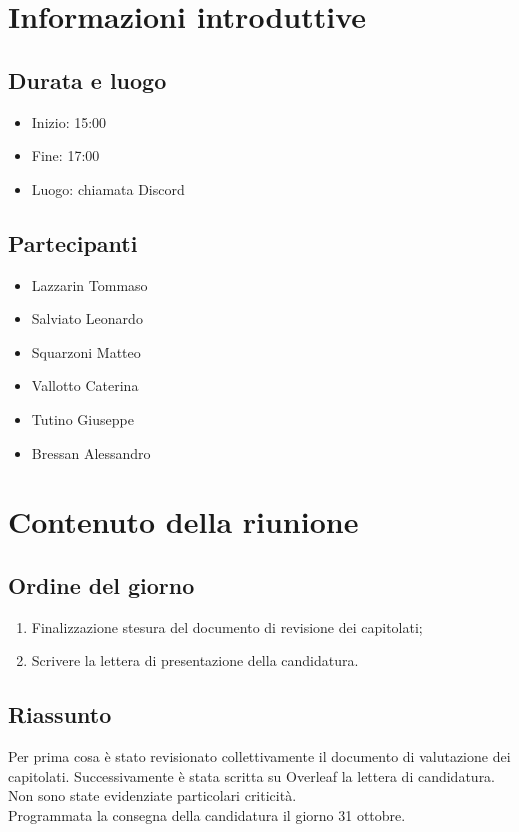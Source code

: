 \documentclass[10pt]{article}
\begin{document}
\section{Informazioni introduttive}
\subsection{Durata e luogo}
\begin{itemize}
  \item Inizio: 15:00
  \item Fine: 17:00
  \item Luogo: chiamata Discord
\end{itemize}
\subsection{Partecipanti}
\begin{itemize}
  \item Lazzarin Tommaso
  \item Salviato Leonardo
  \item Squarzoni Matteo
  \item Vallotto Caterina
  \item Tutino Giuseppe
  \item Bressan Alessandro
\end{itemize}

\section{Contenuto della riunione}
\subsection{Ordine del giorno}
\begin{enumerate}
  \item Finalizzazione stesura del documento di revisione dei capitolati;
  \item Scrivere la lettera di presentazione della candidatura. 
\end{enumerate}

\subsection{Riassunto}
Per prima cosa è stato revisionato collettivamente il documento di valutazione dei capitolati. Successivamente è stata scritta su Overleaf la lettera di candidatura. Non sono state evidenziate particolari criticità.
\\Programmata la consegna della candidatura il giorno 31 ottobre.
\end{document}
